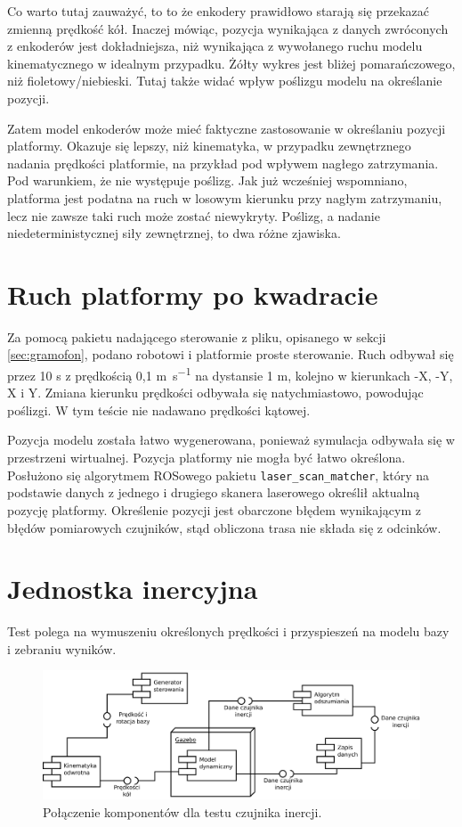 		Co warto tutaj zauważyć, to to że enkodery prawidłowo starają się przekazać zmienną prędkość kół. 
		Inaczej mówiąc, pozycja wynikająca z danych zwróconych z enkoderów jest dokładniejsza, niż wynikająca z wywołanego ruchu modelu kinematycznego w idealnym przypadku.
		Żółty wykres jest bliżej pomarańczowego, niż fioletowy/niebieski.
		Tutaj także widać wpływ poślizgu modelu na określanie pozycji.
		
		Zatem model enkoderów może mieć faktyczne zastosowanie w określaniu pozycji platformy. 
		Okazuje się lepszy, niż kinematyka, w przypadku zewnętrznego nadania prędkości platformie, na przykład pod wpływem nagłego zatrzymania.
		Pod warunkiem, że nie występuje poślizg. Jak już wcześniej wspomniano, platforma jest podatna na ruch w losowym kierunku przy nagłym zatrzymaniu,
		lecz nie zawsze taki ruch może zostać niewykryty. Poślizg, a nadanie niedeterministycznej siły zewnętrznej, to dwa różne zjawiska.
		

\section{Ruch platformy po kwadracie}
	Za pomocą pakietu nadającego sterowanie z pliku, opisanego w sekcji \ref{sec:gramofon}, podano robotowi i platformie proste sterowanie.
	Ruch odbywał się przez 10 \si{\second} z prędkością 0,1 \si{\metre\per\second} na dystansie 1 \si{\metre}, kolejno w kierunkach -X, -Y, X i Y.
	Zmiana kierunku prędkości odbywała się natychmiastowo, powodując poślizgi.
	W tym teście nie nadawano prędkości kątowej.
	
	Pozycja modelu została łatwo wygenerowana, ponieważ symulacja odbywała się w przestrzeni wirtualnej.
	Pozycja platformy nie mogła być łatwo określona. Posłużono się algorytmem ROSowego pakietu \texttt{laser_scan_matcher}, który na podstawie 
	danych z jednego i drugiego skanera laserowego określił aktualną pozycję platformy. Określenie pozycji jest obarczone błędem wynikającym
	z błędów pomiarowych czujników, stąd obliczona trasa nie składa się z odcinków.
	
	
	
\section{Jednostka inercyjna}
\label{sec:test_imu}
	Test polega na wymuszeniu określonych prędkości i przyspieszeń na modelu bazy i zebraniu wyników.
	
	\begin{figure}[H]
		\centering
		\includegraphics[width=\textwidth]{uml/wewucho.pdf}
		\caption{Połączenie komponentów dla testu czujnika inercji.}
		\label{uml:wewucho}
	\end{figure}
	
